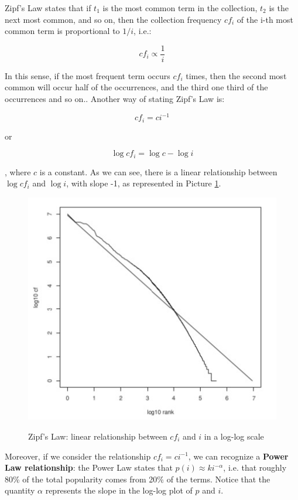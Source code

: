 Zipf's Law states that if $t_1$ is the most common term in the collection, $t_2$ is the next most common, and so on, then the collection frequency $cf_i$ of the i-th
most common term is proportional to $1/i$, i.e.:

$$
cf_i \propto \frac{1}{i}
$$

In this sense, if the most frequent term occurs $cf_i$ times, then the second most common will occur half of the occurrences, and the third one third of the occurrences and so on.. Another way of stating Zipf's Law is:

$$
cf_i = ci^{-1}
$$

or

$$
\log cf_i = \log c  - \log i
$$

, where $c$ is a constant. As we can see, there is a linear relationship between $\log cf_i$ and $\log i$, with slope -1, as represented in Picture \ref{zip}.

\begin{figure}[h!]
		\centering
		\includegraphics[scale = 1.7]{img/zipf law.jpg}
		\label{zip}
        \caption{Zipf's Law: linear relationship between $cf_i$ and $i$ in a log-log scale}
\end{figure}

Moreover, if we consider the relationship $cf_i = ci^{-1}$, we can recognize a \textbf{Power Law relationship}: the Power Law states that $p(i) \approx k i^{-\alpha}$, i.e. that roughly 80\% of the total popularity comes from 20\% of the terms. Notice that the quantity $\alpha$ represents the slope in the log-log plot of $p$ and $i$.

